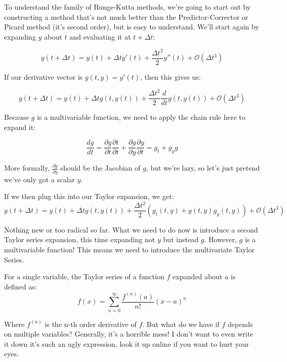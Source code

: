 \documentclass{article}
\theoremstyle{demo}
\begin{document}
To understand the family of Runge-Kutta methods, we're going to start out by
constructing a method that's not much better than the Predictor-Corrector or
Picard method (it's second order), but is easy to understand.  We'll start again
by expanding $y$ about $t$ and evaluating it at $t+\Delta t$:

\begin{equation}
    y(t+\Delta t) = y(t)+\Delta ty'(t) + \frac{\Delta t^2}{2}y''(t) +
    \mathcal{O}(\Delta t^3)
\end{equation}

If our derivative vector is $g(t,y) = y'(t)$, then this gives us:

\begin{equation}
    y(t+\Delta t) = y(t)+\Delta tg(t,y(t)) + \frac{\Delta t^2}{2} \frac{d}{dt}
    g(t,y(t)) + \mathcal{O}(\Delta t^3)
\end{equation}

Because $g$ is a multivariable function, we need to apply the chain rule here to
expand it:

\begin{equation}
    \frac{dg}{dt} = \frac{\partial g}{\partial t}\frac{\partial t}{\partial t} +
    \frac{\partial g}{\partial y}\frac{\partial y}{\partial t} = g_t + g_y g
\end{equation}

More formally, $\frac{\partial g}{\partial y}$ should be the Jacobian of $g$,
but we're lazy, so let's just pretend we've only got a scalar $y$.

If we then plug this into our Taylor expansion, we get:
\begin{equation}
    y(t+\Delta t) = y(t)+\Delta tg(t,y(t)) + \frac{\Delta t^2}{2}(g_t(t,y) +
    g(t,y)g_y(t,y)) + \mathcal{O}(\Delta t^3)
\end{equation}

Nothing new or too radical so far.  What we need to do now is introduce a second
Taylor series expansion, this time expanding not $y$ but instead $g$.  However,
$g$ is a multivariable function!  This means we need to introduce the
multivariate Taylor Series.

For a single variable, the Taylor series of a function $f$ expanded about $a$ is
defined as:
\begin{equation}
    f(x) = \sum_{n=0}^\infty \frac{f^{(n)}(a)}{n!}(x-a)^n
\end{equation}

Where $f^{(n)}$ is the n-th order derivative of $f$.  But what do we have if $f$
depends on multiple variables?  Generally, it's a horrible mess!  I don't want
to even write it down it's such an ugly expression, look it up online if you
want to hurt your eyes.
\end{document}
